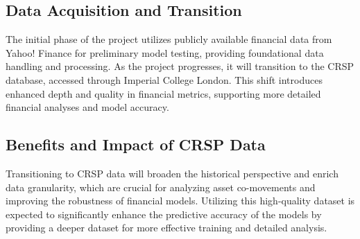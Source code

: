\thesisspacing %

\subsection{Data Acquisition and Transition}
The initial phase of the project utilizes publicly available financial data from Yahoo! Finance for preliminary model testing, providing foundational data handling and processing. As the project progresses, it will transition to the CRSP database, accessed through Imperial College London. This shift introduces enhanced depth and quality in financial metrics, supporting more detailed financial analyses and model accuracy.

\subsection{Benefits and Impact of CRSP Data}
Transitioning to CRSP data will broaden the historical perspective and enrich data granularity, which are crucial for analyzing asset co-movements and improving the robustness of financial models. Utilizing this high-quality dataset is expected to significantly enhance the predictive accuracy of the models by providing a deeper dataset for more effective training and detailed analysis.
